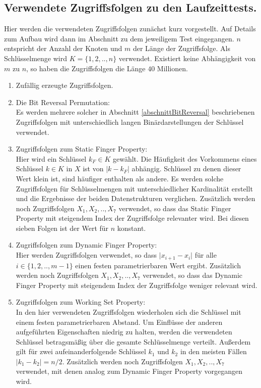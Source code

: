 \documentclass[a4paper,12pt]{article}
\begin{document}
\subsection{Verwendete Zugriffsfolgen zu den Laufzeittests.}
Hier werden die verwendeten Zugriffsfolgen zunächst kurz vorgestellt. Auf Details zum Aufbau wird dann im Abschnitt zu dem  jeweiligem Test eingegangen. $n$ entspricht der Anzahl der Knoten und $m$ der Länge der Zugriffsfolge. Als Schlüsselmenge wird $K = \{1,2,..,n\}$ verwendet. Existiert keine Abhängigkeit von $m$ zu $n$, so haben die Zugriffsfolgen die Länge $40$ Millionen. 

 \begin{enumerate}
 	\item Zufällig erzeugte Zugriffsfolgen.
 	\item Die Bit Reversal Permutation:\\
 	Es werden mehrere solcher in Abschnitt \ref{abschnittBitReversal} beschriebenen Zugriffsfolgen mit unterschiedlich langen Binärdarstellungen der Schlüssel verwendet.
 	\item Zugriffsfolgen zum Static Finger Property: \\
    Hier wird ein Schlüssel $k_F \in K$ gewählt. Die Häufigkeit des Vorkommens eines Schlüssel $k \in K$ in $X$ ist von $\vert k - k_F \vert$ abhängig. Schlüssel zu denen dieser Wert klein ist, sind häufiger enthalten als andere. Es werden solche Zugriffsfolgen für Schlüsselmengen mit unterschiedlicher Kardinalität erstellt und die Ergebnisse der beiden Datenstrukturen verglichen. Zusätzlich werden noch Zugriffsfolgen $X_1, X_2,.., X_7$ verwendet, so dass das Static Finger Property mit steigendem Index der Zugriffsfolge relevanter wird. Bei diesen sieben Folgen ist der Wert für $n$ konstant.
 	 \item Zugriffsfolgen zum Dynamic Finger Property:\\
 	Hier werden Zugriffsfolgen verwendet, so dass $\vert x_{i+1} - x_{i} \vert$ für alle \\
 	 \mbox{$i \in \{1, 2,..,m -1\} $} einen festen parametrierbaren Wert ergibt.  Zusätzlich werden noch Zugriffsfolgen $X_1, X_2,.., X_7$ verwendet, so dass das Dynamic Finger Property mit steigendem Index der Zugriffsfolge weniger relevant wird.
 	\item Zugriffsfolgen zum Working Set Property:\\
 	In den hier verwendeten Zugriffsfolgen wiederholen sich die Schlüssel mit einem festen parametrierbaren Abstand. Um Einflüsse der anderen aufgeführten Eigenschaften niedrig zu halten, werden die verwendeten Schlüssel betragsmäßig über die gesamte Schlüsselmenge verteilt. Außerdem gilt für zwei aufeinanderfolgende Schlüssel $k_1$ und $k_2$ in den meisten Fällen $\vert k_1 - k_2 \vert = n /2$. Zusätzlich werden noch Zugriffsfolgen $X_1, X_2,.., X_7$ verwendet, mit denen analog zum Dynamic Finger Property vorgegangen wird.

\end{enumerate}
\end{document}

